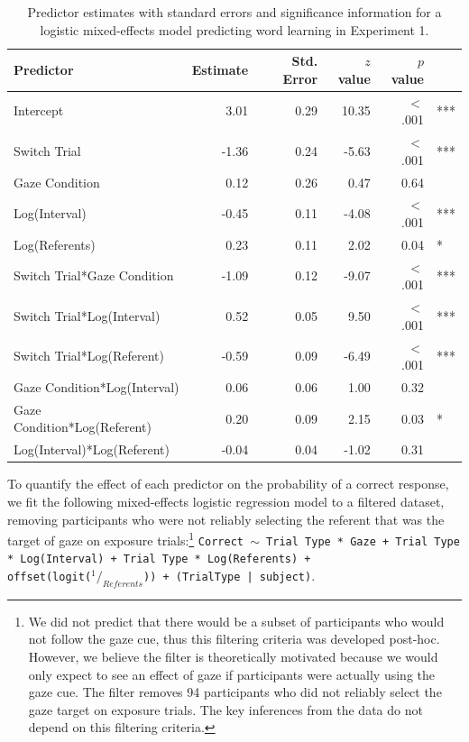 \documentclass[authoryear, review]{elsarticle}
\begin{document}
\begin{table}[tb]
\centering
\begin{tabular}{lrrrrl}
 Predictor & Estimate & Std. Error & $z$ value & $p$ value &  \\ 
  \hline
Intercept & 3.01 & 0.29 & 10.35 & $<$ .001 & *** \\ 
  Switch Trial & -1.36 & 0.24 & -5.63 & $<$ .001 & *** \\ 
  Gaze Condition & 0.12 & 0.26 & 0.47 & 0.64 &  \\ 
  Log(Interval) & -0.45 & 0.11 & -4.08 & $<$ .001 & *** \\ 
  Log(Referents) & 0.23 & 0.11 & 2.02 & 0.04 & * \\ 
  Switch Trial*Gaze Condition & -1.09 & 0.12 & -9.07 & $<$ .001 & *** \\ 
  Switch Trial*Log(Interval) & 0.52 & 0.05 & 9.50 & $<$ .001 & *** \\ 
  Switch Trial*Log(Referent) & -0.59 & 0.09 & -6.49 & $<$ .001 & *** \\ 
  Gaze Condition*Log(Interval) & 0.06 & 0.06 & 1.00 & 0.32 &  \\ 
  Gaze Condition*Log(Referent) & 0.20 & 0.09 & 2.15 & 0.03 & * \\ 
  Log(Interval)*Log(Referent) & -0.04 & 0.04 & -1.02 & 0.31 &  \\ 
   \hline
\end{tabular}
\caption{Predictor estimates with standard errors and significance information for a logistic mixed-effects model predicting word learning in Experiment 1.} 
\label{tab:exp1_reg}
\end{table}

To quantify the effect of each predictor on the probability of a correct
response, we fit the following mixed-effects logistic regression model
to a filtered dataset, removing participants who were not reliably
selecting the referent that was the target of gaze on exposure
trials:\footnote{We did not predict that there would be a subset of
  participants who would not follow the gaze cue, thus this filtering
  criteria was developed post-hoc. However, we believe the filter is
  theoretically motivated because we would only expect to see an effect
  of gaze if participants were actually using the gaze cue. The filter
  removes 94 participants who did not reliably select the gaze target on
  exposure trials. The key inferences from the data do not depend on
  this filtering criteria.}
\texttt{Correct $\sim$ Trial Type * Gaze + Trial Type * Log(Interval) + Trial Type * Log(Referents) + \\ offset(logit($^1/_{Referents}$)) + (TrialType | subject)}.
\end{document}
